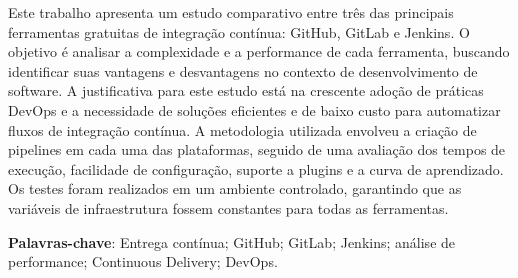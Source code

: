 
\begin{resumoutfpr}%
Este trabalho apresenta um estudo comparativo entre três das principais ferramentas gratuitas de integração contínua: GitHub, GitLab e Jenkins. O objetivo é analisar a complexidade e a performance de cada ferramenta, buscando identificar suas vantagens e desvantagens no contexto de desenvolvimento de software. A justificativa para este estudo está na crescente adoção de práticas DevOps e a necessidade de soluções eficientes e de baixo custo para automatizar fluxos de integração contínua. A metodologia utilizada envolveu a criação de pipelines em cada uma das plataformas, seguido de uma avaliação dos tempos de execução, facilidade de configuração, suporte a plugins e a curva de aprendizado. Os testes foram realizados em um ambiente controlado, garantindo que as variáveis de infraestrutura fossem constantes para todas as ferramentas. 

\textbf{Palavras-chave}: Entrega contínua; GitHub; GitLab; Jenkins; análise de performance; Continuous Delivery; DevOps.

 
\end{resumoutfpr}
